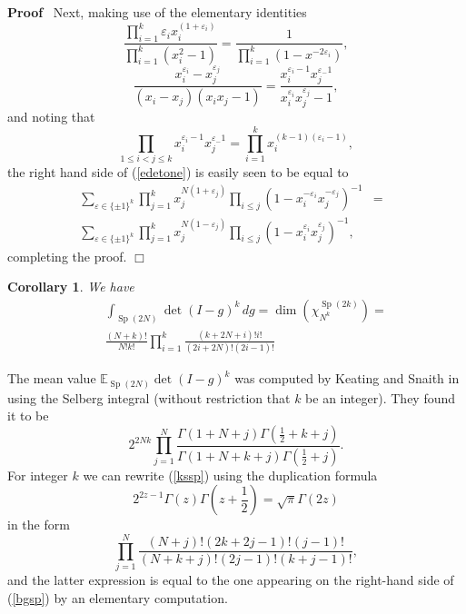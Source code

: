 \documentclass[11pt]{amsart}
\newcommand{\tmop}[1]{\ensuremath{\operatorname{#1}}}
\renewenvironment{proof}{
\noindent\textbf{Proof}\ }{\hspace*{\fill}
\begin{math}\Box\end{math}\medskip}
\newtheorem{corollary}{Corollary}
\begin{document}
\begin{proof}
  Next, making use of the elementary identities
  \begin{equation}
    \label{el1} \frac{\prod_{i = 1}^k \varepsilon_i x_i^{( 1 + \varepsilon_i
    )}}{\prod_{i = 1}^k ( x_i^2 - 1 )} = \frac{1}{\prod_{i = 1}^k ( 1 - x^{- 2
    \varepsilon_i} )},
  \end{equation}
  \begin{equation}
    \label{el2} \frac{x_i^{\varepsilon_i} - x_j^{\varepsilon_j}}{( x_i - x_j )
    ( x_i x_j - 1 )} = \frac{x_i^{\varepsilon_i - 1} x_j^{\varepsilon_-
    1}}{x_i^{\varepsilon_i} x_j^{\varepsilon_j} - 1},
  \end{equation}
  and noting that
  \begin{equation}
    \label{el3} \prod_{1 \leqslant i < j \leqslant k} x_i^{\varepsilon_i - 1}
    x_j^{\varepsilon_- 1} = \prod_{i = 1}^k x_i^{( k - 1 ) ( \varepsilon_i - 1
    )},
  \end{equation}
  the right hand side of (\ref{edetone}) is easily seen to be equal to
  \begin{eqnarray*}
    \sum_{\varepsilon \in \{ \pm 1 \}^k} \prod_{j = 1}^k x_j^{N ( 1 +
    \varepsilon_j )} \prod_{i \leqslant j} ( 1 - x_i^{- \varepsilon_i} x_j^{-
    \varepsilon_j} )^{- 1} & = & \\
    \sum_{\varepsilon \in \{ \pm 1 \}^k} \prod_{j = 1}^k x_j^{N ( 1 -
    \varepsilon_j )} \prod_{i \leqslant j} ( 1 - x_i^{\varepsilon_i}
    x_j^{\varepsilon_j} )^{- 1}, &  &
  \end{eqnarray*}
  completing the proof.
\end{proof}

\begin{corollary}
\label{corsp}We have
  \begin{eqnarray}
    &  & \int_{\tmop{Sp} ( 2 N )} \det ( I - g )^k \, d g = \dim (
    \chi_{N^k}^{\tmop{Sp} ( 2 k )} ) = \nonumber\\
    &  & \frac{( N + k ) !}{N!k!} \prod_{i = 1}^k \frac{( k + 2 N + i )
    !i!}{( 2 i + 2 N ) ! ( 2 i - 1 ) !}  \label{bgsp}
  \end{eqnarray}
\end{corollary}

The mean value $\mathbb{E}_{\tmop{Sp} ( 2 N )} \det ( I - g )^k$
was computed by Keating and Snaith in {\cite{KS00}} using the
Selberg integral (without restriction that $k$ be an integer).
They found it to be
\begin{equation}
  \label{kssp} 2^{2 Nk} \prod_{j = 1}^N \frac{\Gamma ( 1 + N + j ) \Gamma (
  \frac{1}{2} + k + j )}{\Gamma ( 1 + N + k + j ) \Gamma ( \frac{1}{2} + j )}
  .
\end{equation}
For integer $k$ we can rewrite (\ref{kssp}) using the duplication
formula
\[ 2^{2 z - 1} \Gamma ( z ) \Gamma \left( z + \frac{1}{2} \right) = \sqrt{\pi}
   \Gamma ( 2 z ) \]
in the form
\[ \prod_{j = 1}^N \frac{( N + j ) ! ( 2 k + 2 j - 1 ) ! ( j - 1 ) !}{( N + k
   + j ) ! ( 2 j - 1 ) ! ( k + j - 1 ) !}, \]
and the latter expression is equal to the one appearing on the
right-hand side of (\ref{bgsp}) by an elementary computation.
\end{document}
